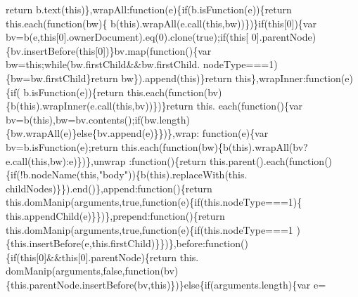 \begin{DoxyCode}
{{      return} b.text(\textcolor{keyword}{this})\},wrapAll:\textcolor{keyword}{function}(e)\{\textcolor{keywordflow}{if}(b.isFunction(e))\{\textcolor{keywordflow}{return} this.each(\textcolor{keyword}{function}(bw)\{
      b(\textcolor{keyword}{this}).wrapAll(e.call(\textcolor{keyword}{this},bw))\})\}\textcolor{keywordflow}{if}(\textcolor{keyword}{this}[0])\{var bv=b(e,\textcolor{keyword}{this}[0].ownerDocument).eq(0).clone(\textcolor{keyword}{true});\textcolor{keywordflow}{if}(\textcolor{keyword}{this}[
      0].parentNode)\{bv.insertBefore(\textcolor{keyword}{this}[0])\}bv.map(\textcolor{keyword}{function}()\{var bw=\textcolor{keyword}{this};\textcolor{keywordflow}{while}(bw.firstChild&&bw.firstChild.
      nodeType===1)\{bw=bw.firstChild\}\textcolor{keywordflow}{return} bw\}).append(\textcolor{keyword}{this})\}\textcolor{keywordflow}{return} \textcolor{keyword}{this}\},wrapInner:\textcolor{keyword}{function}(e)\{\textcolor{keywordflow}{if}(
      b.isFunction(e))\{\textcolor{keywordflow}{return} this.each(\textcolor{keyword}{function}(bv)\{b(\textcolor{keyword}{this}).wrapInner(e.call(\textcolor{keyword}{this},bv))\})\}\textcolor{keywordflow}{return} this.
      each(\textcolor{keyword}{function}()\{var bv=b(\textcolor{keyword}{this}),bw=bv.contents();\textcolor{keywordflow}{if}(bw.length)\{bw.wrapAll(e)\}\textcolor{keywordflow}{else}\{bv.append(e)\}\})\},wrap:\textcolor{keyword}{
      function}(e)\{var bv=b.isFunction(e);\textcolor{keywordflow}{return} this.each(\textcolor{keyword}{function}(bw)\{b(\textcolor{keyword}{this}).wrapAll(bv?e.call(\textcolor{keyword}{this},bw):e)\})\},unwrap
      :\textcolor{keyword}{function}()\{\textcolor{keywordflow}{return} this.parent().each(\textcolor{keyword}{function}()\{\textcolor{keywordflow}{if}(!b.nodeName(\textcolor{keyword}{this},\textcolor{stringliteral}{"body"}))\{b(\textcolor{keyword}{this}).replaceWith(this.
      childNodes)\}\}).end()\},append:\textcolor{keyword}{function}()\{\textcolor{keywordflow}{return} this.domManip(arguments,\textcolor{keyword}{true},\textcolor{keyword}{function}(e)\{\textcolor{keywordflow}{if}(this.nodeType===1)\{
      this.appendChild(e)\}\})\},prepend:\textcolor{keyword}{function}()\{\textcolor{keywordflow}{return} this.domManip(arguments,\textcolor{keyword}{true},\textcolor{keyword}{function}(e)\{\textcolor{keywordflow}{if}(this.nodeType===1
      )\{this.insertBefore(e,this.firstChild)\}\})\},before:\textcolor{keyword}{function}()\{\textcolor{keywordflow}{if}(\textcolor{keyword}{this}[0]&&\textcolor{keyword}{this}[0].parentNode)\{\textcolor{keywordflow}{return} this.
      domManip(arguments,\textcolor{keyword}{false},\textcolor{keyword}{function}(bv)\{this.parentNode.insertBefore(bv,\textcolor{keyword}{this})\})\}\textcolor{keywordflow}{else}\{\textcolor{keywordflow}{if}(arguments.length)\{var e=
}
\end{DoxyCode}
